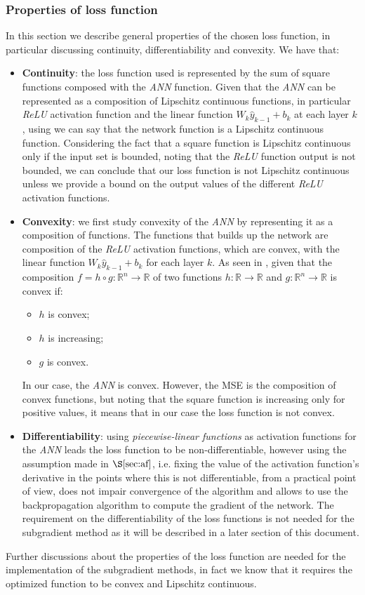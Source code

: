 \subsubsection{Properties of loss function}
\label{subsub:lfprop}
In this section we describe general properties of the chosen loss function, in particular discussing continuity, differentiability and convexity.
We have that:
\begin{itemize}
    \item \textbf{Continuity}: the loss function used is represented by the sum of square functions composed with the \textit{ANN} function. Given that the \textit{ANN} can be represented as a composition of Lipschitz continuous functions, in particular \textit{ReLU} activation function and the linear function $W_k\hat{y}_{k-1} + b_k$ at each layer $k$, using \parencite[Claim 12.7]{ml} we can say that the network function is a Lipschitz continuous function. Considering the fact that a square function is Lipschitz continuous only if the input set is bounded, noting that the \textit{ReLU} function output is not bounded, we can conclude that our loss function is not Lipschitz continuous unless we provide a bound on the output values of the different \textit{ReLU} activation functions.
    \item \textbf{Convexity}: we first study convexity of the \textit{ANN} by representing it as a composition of functions. The functions that builds up the network are composition of the \textit{ReLU} activation functions, which are convex, with the linear function $W_k\hat{y}_{k-1} + b_k$ for each layer $k$. As seen in \parencite[Chap. 3.2.4]{boyd}, given that the composition $f=h\circ g:\mathbb{R}^n\to\mathbb{R}$ of two functions $h:\mathbb{R}\to\mathbb{R}$ and $g:\mathbb{R}^n\to\mathbb{R}$ is convex if:
        \begin{itemize}
            \item $h$ is convex;
            \item $h$ is increasing;
            \item $g$ is convex.
        \end{itemize}
    In our case, the \textit{ANN} is convex. However, the MSE is the composition of convex functions, but noting that the square function is increasing only for positive values, it means that in our case the loss function is not convex.
    \item \textbf{Differentiability}: using \textit{piecewise-linear functions} as activation functions for the \textit{ANN} leads the loss function to be non-differentiable, however using the assumption made in $\S\ref{sec:af}$, i.e. fixing the value of the activation function's derivative in the points where this is not differentiable, from a practical point of view, does not impair convergence of the algorithm and allows to use the backpropagation algorithm to compute the gradient of the network. The requirement on the differentiability of the loss functions is not needed for the subgradient method as it will be described in a later section of this document.
\end{itemize}
Further discussions about the properties of the loss function are needed for the implementation of the subgradient methods, in fact we know that it requires the optimized function to be convex and Lipschitz continuous. 